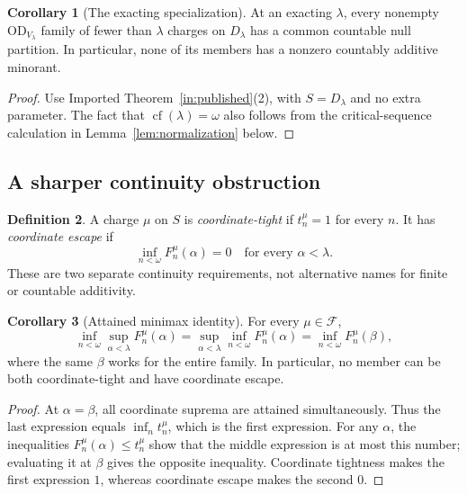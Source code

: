 \documentclass[11pt,letterpaper]{article}
\theoremstyle{definition}
\newtheorem{definition}{Definition}[section]
\newtheorem{corollary}[definition]{Corollary}
\newcommand{\OD}{\mathrm{OD}}
\newcommand{\cf}{\operatorname{cf}}
\newcommand{\ODlam}{\OD_{V_\lambda}}
\newcommand{\Dlam}{D_\lambda}
\begin{document}
\begin{corollary}[The exacting specialization]\label{cor:exactingnull}
At an exacting $\lambda$, every nonempty $\ODlam$ family of fewer than $\lambda$ charges on $\Dlam$ has a common countable null partition. In particular, none of its members has a nonzero countably additive minorant.
\end{corollary}

\begin{proof}
Use Imported Theorem~\ref{in:published}(2), with $S=\Dlam$ and no extra parameter. The fact that $\cf(\lambda)=\omega$ also follows from the critical-sequence calculation in Lemma~\ref{lem:normalization} below.
\end{proof}

\subsection{A sharper continuity obstruction}

\begin{definition}
A charge $\mu$ on $S$ is \emph{coordinate-tight} if $t_n^\mu=1$ for every $n$. It has \emph{coordinate escape} if
\[
 \inf_{n<\omega}F_n^\mu(\alpha)=0
 \quad\text{for every }\alpha<\lambda.
\]
These are two separate continuity requirements, not alternative names for finite or countable additivity.
\end{definition}

\begin{corollary}[Attained minimax identity]\label{cor:minimax}
For every $\mu\in\mathcal F$,
\begin{equation}\label{eq:minimax}
 \inf_{n<\omega}\sup_{\alpha<\lambda}F_n^\mu(\alpha)
 =\sup_{\alpha<\lambda}\inf_{n<\omega}F_n^\mu(\alpha)
 =\inf_{n<\omega}F_n^\mu(\beta),
\end{equation}
where the same $\beta$ works for the entire family. In particular, no member can be both coordinate-tight and have coordinate escape.
\end{corollary}

\begin{proof}
At $\alpha=\beta$, all coordinate suprema are attained simultaneously. Thus the last expression equals $\inf_n t_n^\mu$, which is the first expression. For any $\alpha$, the inequalities $F_n^\mu(\alpha)\le t_n^\mu$ show that the middle expression is at most this number; evaluating it at $\beta$ gives the opposite inequality. Coordinate tightness makes the first expression $1$, whereas coordinate escape makes the second $0$.
\end{proof}
\end{document}
